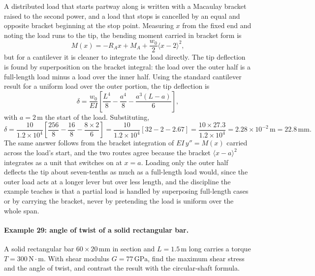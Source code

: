 A distributed load that starts partway along is written with a Macaulay
bracket raised to the second power, and a load that stops is cancelled
by an equal and opposite bracket beginning at the stop point. Measuring
$x$ from the fixed end and noting the load runs to the tip, the bending
moment carried in bracket form is
\[
M(x) = -R_A x + M_A + \frac{w_0}{2}\langle x - 2\rangle^2,
\]
but for a cantilever it is cleaner to integrate the load directly. The
tip deflection is found by superposition on the bracket integral: the
load over the outer half is a full-length load minus a load over the
inner half. Using the standard cantilever result for a uniform load over
the outer portion, the tip deflection is
\[
\delta = \frac{w_0}{EI}\left[\frac{L^4}{8} - \frac{a^4}{8}
- \frac{a^3 (L-a)}{6}\right],
\]
with $a = 2\,\si{\meter}$ the start of the load. Substituting,
\[
\delta = \frac{10}{1.2 \times 10^4}\left[\frac{256}{8}
- \frac{16}{8} - \frac{8 \times 2}{6}\right]
= \frac{10}{1.2 \times 10^4}\left[32 - 2 - 2.67\right]
= \frac{10 \times 27.3}{1.2 \times 10^4}
= 2.28 \times 10^{-2}\,\si{\meter} = 22.8\,\si{\milli\meter}.
\]
The same answer follows from the bracket integration of $EI\,y'' =
M(x)$ carried across the load's start, and the two routes agree because
the bracket $\langle x - a\rangle^2$ integrates as a unit that switches
on at $x = a$. Loading only the outer half deflects the tip about
seven-tenths as much as a full-length load would, since the outer load
acts at a longer lever but over less length, and the discipline the
example teaches is that a partial load is handled by superposing
full-length cases or by carrying the bracket, never by pretending the
load is uniform over the whole span.

\paragraph{Example 29: angle of twist of a solid rectangular bar.} A
solid rectangular bar $60 \times 20\,\si{\milli\meter}$ in section and
$L = 1.5\,\si{\meter}$ long carries a torque $T = 300\,\text{N}\cdot
\text{m}$. With shear modulus $G = 77\,\text{GPa}$, find the maximum
shear stress and the angle of twist, and contrast the result with the
circular-shaft formula.

